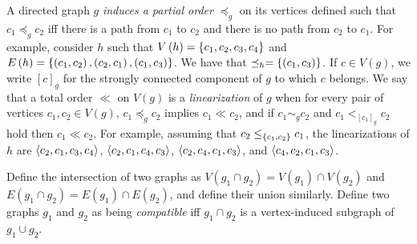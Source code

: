 A directed graph $g$ \emph{induces a partial order} $\preceq_g$ on its vertices defined such that $c_1 \preceq_g c_2$ iff there is a path from $c_1$ to $c_2$ and there is no path from $c_2$ to $c_1$.
For example, consider $h$ such that $V\left( h \right)=\left\{c_1,c_2,c_3,c_4\right\}$ and $E\left( h \right)=\left\{\left( c_1,c_2 \right),\left( c_2,c_1 \right),\left( c_1,c_3 \right)\right\}$. 
We have that $\preceq_h = \left\{\left( c_1,c_3 \right)\right\}$. %
If $c\in V\left( g \right)$, we write $\left[ c \right]_g$ for the strongly connected component of $g$ to which $c$ belongs. 
We say that a total order $\ll$ on $V\left( g \right)$ is a \emph{linearization} of $g$ when for every pair of vertices $c_1,c_2\in V\left( g \right)$, $c_1 \preceq_g c_2$ implies $c_1 \ll c_2$, and if $c_1 \sim_g c_2$ and $ c_1 <_{\left[ c_1 \right]_g} c_2$ hold then $c_1 \ll c_2$. For example, assuming that $c_2 \leq_{\left\{c_1,c_2\right\}} c_1$, the linearizations of $h$ are $\left\langle c_2,c_1,c_3,c_4\right\rangle$, $\left\langle c_2,c_1,c_4,c_3\right\rangle$, $\left\langle c_2,c_4,c_1,c_3\right\rangle$, and $\left\langle c_4,c_2,c_1,c_3\right\rangle$.

\begin{comment}
We now define a partial order on graphs. If $g_1$ and $g_2$ are two graphs, then we write $g_1 \leq g_2$ iff $V\left( g_1 \right)\subseteq V\left( g_2 \right)$, and if $v\in V\left( g_1 \right)$, $e\in E\left( g_2 \right)$, and $v$ is an endpoint of $e$, then $e\in E\left( g_1 \right)$. 
For example, consider the graphs $h'$ and $h''$ such that $V\left( h' \right)=\aset{c_1,c_2,c_4}$, $E\left( h' \right)=\aset{\left( c_1,c_2 \right),\left( c_2,c_1 \right)}$, $V\left( h'' \right)=\aset{c_1,c_3,c_4}$, and $E\left( h'' \right)=\aset{\left( c_1,c_3 \right)}$. We have that $h'\leq h$, but $ h''\not\leq h$.
\end{comment}

Define the intersection of two graphs as $V\left( g_1 \cap g_2 \right)=V\left( g_1 \right)\cap V\left( g_2 \right)$ and $E\left( g_1 \cap g_2 \right)= E\left( g_1 \right)\cap E\left( g_2 \right)$, and define their union similarly.
Define two graphs $g_1$ and $g_2$ as being \emph{compatible} iff $g_1 \cap g_2$ is a vertex-induced subgraph of $g_1 \cup g_2$.

